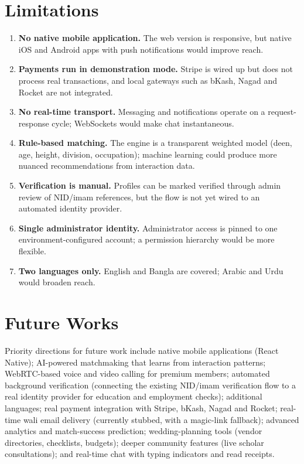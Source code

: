 \documentclass[12pt,a4paper]{report}
\begin{document}
\section{Limitations}
\begin{enumerate}
  \item \textbf{No native mobile application.} The web version is responsive,
        but native iOS and Android apps with push notifications would improve
        reach.
  \item \textbf{Payments run in demonstration mode.} Stripe is wired up but
        does not process real transactions, and local gateways such as bKash,
        Nagad and Rocket are not integrated.
  \item \textbf{No real-time transport.} Messaging and notifications operate on
        a request-response cycle; WebSockets would make chat instantaneous.
  \item \textbf{Rule-based matching.} The engine is a transparent weighted model
        (deen, age, height, division, occupation); machine learning could
        produce more nuanced recommendations from interaction data.
  \item \textbf{Verification is manual.} Profiles can be marked verified through
        admin review of NID/imam references, but the flow is not yet wired to an
        automated identity provider.
  \item \textbf{Single administrator identity.} Administrator access is pinned
        to one environment-configured account; a permission hierarchy would be
        more flexible.
  \item \textbf{Two languages only.} English and Bangla are covered; Arabic and
        Urdu would broaden reach.
\end{enumerate}

\section{Future Works}
Priority directions for future work include native mobile applications (React
Native); AI-powered matchmaking that learns from interaction patterns;
WebRTC-based voice and video calling for premium members; automated background
verification (connecting the existing NID/imam verification flow to a real
identity provider for education and employment checks); additional languages;
real payment integration with Stripe, bKash, Nagad and Rocket; real-time wali
email delivery (currently stubbed, with a magic-link fallback); advanced
analytics and match-success prediction; wedding-planning tools (vendor
directories, checklists, budgets); deeper community features (live scholar
consultations); and real-time chat with typing indicators and read receipts.
\end{document}
